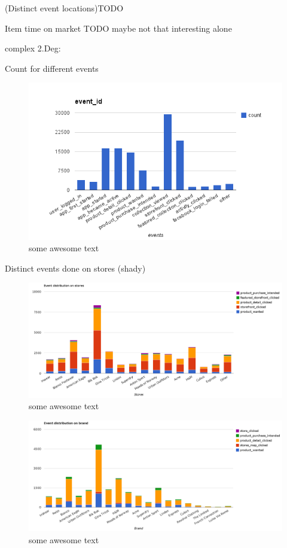         (Distinct event locations)TODO

        Item time on market TODO maybe not that interesting alone


    complex 2.Deg:

        Count for different events

\begin{figure}[H]
    \includegraphics[width=5in]{image/event_id.png}
    \centering
    \caption[Count for different events]{some awesome text}
    \label{figure:ratingdistr}
\end{figure}

        Distinct events done on stores (shady)

\begin{figure}[H]
    \includegraphics[width=5in]{image/event_distr.png}
    \centering
    \caption[Distribution of events on storefronts]{some awesome text}
    \label{figure:ratingdistr}
\end{figure}

\begin{figure}[H]
    \includegraphics[width=5in]{image/brand_distr.png}
    \centering
    \caption[Distribution of events on brands]{some awesome text}
    \label{figure:ratingdistr}
\end{figure}


